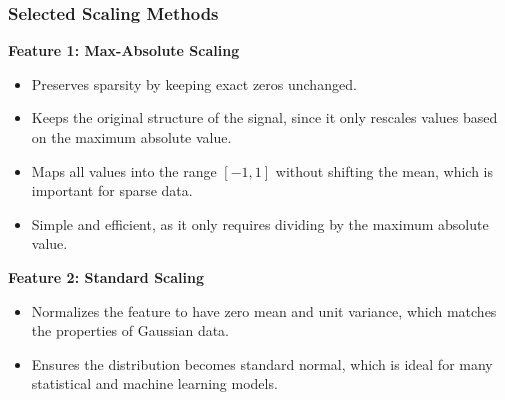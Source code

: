 \documentclass[12pt]{article}
\begin{document}
\subsubsection{Selected Scaling Methods}

\textbf{Feature 1: Max-Absolute Scaling}

\begin{itemize}
    \item Preserves sparsity by keeping exact zeros unchanged.
    \item Keeps the original structure of the signal, since it only rescales values based on the maximum absolute value.
    \item Maps all values into the range $[-1, 1]$ without shifting the mean, which is important for sparse data.
    \item Simple and efficient, as it only requires dividing by the maximum absolute value.
\end{itemize}

\textbf{Feature 2: Standard Scaling}

\begin{itemize}
    \item Normalizes the feature to have zero mean and unit variance, which matches the properties of Gaussian data.
    \item Ensures the distribution becomes standard normal, which is ideal for many statistical and machine learning models.
\end{itemize}



\end{document}
